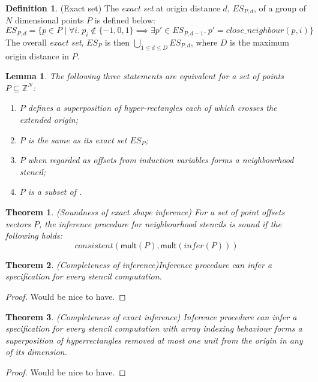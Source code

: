 \documentclass[acmlarge,review]{acmart}
\theoremstyle{definition}
\newtheorem{defn}{Definition}
\theoremstyle{plain}
\newtheorem{thm}{Theorem}
\newtheorem{lem}{Lemma}
\theoremstyle{remark}
\begin{document}
\begin{defn}{(Exact set)}
  The \emph{exact set} at origin distance $d$, $\mathit{ES}_{P,d}$, of a group
  of $N$ dimensional points $P$ is defined below:
%
  \begin{equation*}
    \mathit{ES}_{P,d} =
      \{ p \in P \mid \forall i.\
         p_i \notin \{-1,0,1\} \implies
         \exists p' \in \mathit{ES}_{P,d-1}.\ p' =
         \mathit{close\_neighbour}(p,i) \}
  \end{equation*}
%
  The overall \emph{exact set}, $\mathit{ES}_P$ is then
  $\bigcup_{1 \leq d \leq D} \mathit{ES}_{P,d}$, where $D$ is the maximum origin
  distance in $P$.
\end{defn}

\begin{lem}
  The following three statements are equivalent for a set of points $P \subseteq
  \mathbb{Z}^N$:
%
  \begin{enumerate}
    \item $P$ defines a superposition of hyper-rectangles each of which crosses
      the extended origin;
    \item $P$ is the same as its exact set $\mathit{ES}_P$;
    \item $P$ when regarded as offsets from induction variables forms a
      neighbourhood stencil;
    \item $P$ is a subset of .
  \end{enumerate}
\end{lem}

\begin{thm}{(Soundness of exact shape inference)}
  For a set of point offsets vectors $P$, the inference procedure for
  neighbourhood stencils is sound if the following holds:
%
  \begin{equation*}
    \mathit{consistent}(\mathsf{mult}(P),\mathsf{mult}(\mathit{infer}(P)))
  \end{equation*}
\end{thm}

\begin{thm}{(Completeness of inference)}\label{thm:inf-completeness}
  Inference procedure can infer a specification for every stencil computation.
\end{thm}
%
\begin{proof}
  Would be nice to have.
\end{proof}

\begin{thm}{(Completeness of exact inference)}
  Inference procedure can infer a specification for every stencil computation
  with array indexing behaviour forms a superposition of hyperrectangles removed
  at most one unit from the origin in any of its dimension.
\end{thm}
%
\begin{proof}
  Would be nice to have.
\end{proof}
\end{document}
